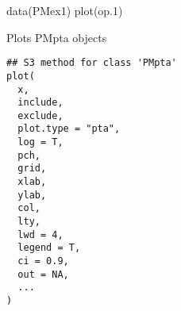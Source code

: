 \documentclass[a4paper]{book}
\begin{document}
%
\begin{Examples}
\begin{ExampleCode}
data(PMex1)
plot(op.1)
\end{ExampleCode}
\end{Examples}
%
\begin{Description}\relax
Plots PMpta objects
\end{Description}
%
\begin{Usage}
\begin{verbatim}
## S3 method for class 'PMpta'
plot(
  x,
  include,
  exclude,
  plot.type = "pta",
  log = T,
  pch,
  grid,
  xlab,
  ylab,
  col,
  lty,
  lwd = 4,
  legend = T,
  ci = 0.9,
  out = NA,
  ...
)
\end{verbatim}
\end{Usage}
%
\end{document}
